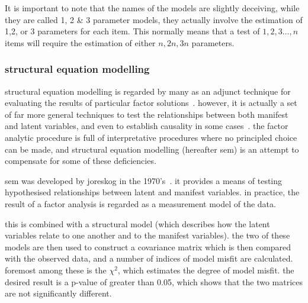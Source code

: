 
It is important to note that the names of the models are slightly deceiving, while they are called 1, 2 \& 3 parameter models, they actually involve the estimation of 1,2, or 3 parameters for each item. This normally means that a test of ${1,2,3\ldots, n}$ items will require the estimation of either ${n, 2n, 3n}$ parameters. %


\subsubsection{structural equation modelling}
\label{sec:struct-equat-model}

structural equation modelling is regarded by many as an adjunct technique for evaluating the results of particular factor solutions~\cite{fabrigar1999evaluating}. however, it is actually a set of far more general techniques to test the relationships between both manifest and latent variables, and even to establish causality in some cases~\cite{pearl1998graphs}. the factor analytic procedure is full of interpretative procedures where no principled choice can be made, and structural equation modelling (hereafter sem) is an attempt to compensate for some of these deficiencies.

sem was developed by joreskog in the 1970's~\cite{joreskog1978structural}. it provides a means of testing hypothesised relationships between latent and manifest variables. in practice, the result of a factor analysis is regarded as a measurement model of the data.

this is combined with a structural model (which describes how the latent variables relate to one another and to the manifest variables). the two of these models are then used to construct a covariance matrix which is then compared with the observed data, and a number of indices of model misfit are calculated. foremost among these is the $\chi^2$, which estimates the degree of model misfit. the desired result is a p-value of greater than 0.05, which shows that the two matrices are not significantly different.

